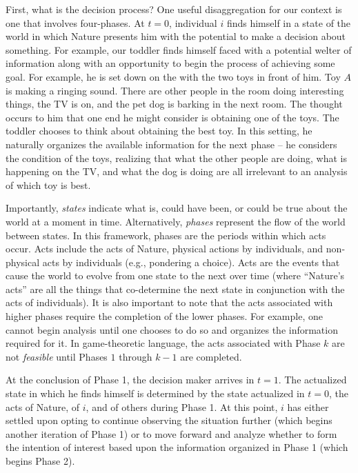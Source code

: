 \documentclass[
11pt,
titlepage,
reqno,
]{article}%
\theoremstyle{definition}
\begin{document}
First, what is the decision process? One useful disaggregation for our context is one that involves four-phases. At $t=0$, individual $i$ finds himself in a state of the world in which Nature presents him with the potential to make a decision about something. For example, our toddler finds himself faced with a potential welter of information along with an opportunity to begin the process of achieving some goal. For example, he is set down on the with the two toys in front of him. Toy $A$ is making a ringing sound. There are other people in the room doing interesting things, the TV is on, and the pet dog is barking in the next room. The thought occurs to him that one end he might consider is  obtaining one of the toys. The toddler chooses to think about obtaining the best toy. In this setting, he naturally organizes the available information for the next phase -- he considers the condition of the toys, realizing that what the other people are doing, what is happening on the TV, and what the dog is doing are all irrelevant to an analysis of which toy is best.  

Importantly, \textit{states} indicate what is, could have been, or could be true about the world at a moment in time. Alternatively, \textit{phases} represent the flow of the world between states. In this framework, phases are the periods within which acts occur. Acts include the acts of Nature, physical actions by individuals, and non-physical acts by individuals (e.g., pondering a choice). Acts are the events that cause the world to evolve from one state to the next over time (where ``Nature's acts'' are all the things that co-determine the next state in conjunction with the acts of individuals). It is also important to note that the acts associated with higher phases require the completion of the lower phases. For example, one cannot begin analysis until one chooses to do so and organizes the information required for it. In game-theoretic language, the acts associated with Phase $k$ are not \textit{feasible} until Phases $1$ through $k-1$ are completed. 

At the conclusion of Phase 1, the decision maker arrives in $t=1$. The actualized state in which he finds himself is determined by the state actualized in $t=0$, the acts of Nature, of $i$, and of others during Phase 1. At this point, $i$ has either settled upon opting to continue observing the situation further (which begins another iteration of Phase 1) or to move forward and analyze whether to form the intention of interest based upon the information organized in Phase 1 (which begins Phase 2). 
\end{document}

